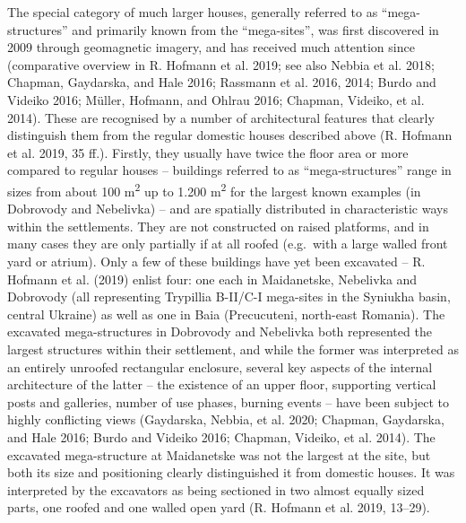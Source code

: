 \documentclass[
  12pt,
  a4paper, twoside]{book}
\begin{document}
The special category of much larger houses, generally referred to as ``mega-structures'' and primarily known from the ``mega-sites'', was first discovered in 2009 through geomagnetic imagery, and has received much attention since (comparative overview in R. Hofmann et al. 2019; see also Nebbia et al. 2018; Chapman, Gaydarska, and Hale 2016; Rassmann et al. 2016, 2014; Burdo and Videiko 2016; Müller, Hofmann, and Ohlrau 2016; Chapman, Videiko, et al. 2014). These are recognised by a number of architectural features that clearly distinguish them from the regular domestic houses described above (R. Hofmann et al. 2019, 35 ff.). Firstly, they usually have twice the floor area or more compared to regular houses -- buildings referred to as ``mega-structures'' range in sizes from about 100 m\textsuperscript{2} up to 1.200 m\textsuperscript{2} for the largest known examples (in Dobrovody and Nebelivka) -- and are spatially distributed in characteristic ways within the settlements. They are not constructed on raised platforms, and in many cases they are only partially if at all roofed (e.g.~with a large walled front yard or atrium). Only a few of these buildings have yet been excavated -- R. Hofmann et al. (2019) enlist four: one each in Maidanetske, Nebelivka and Dobrovody (all representing Trypillia B-II/C-I mega-sites in the Syniukha basin, central Ukraine) as well as one in Baia (Precucuteni, north-east Romania). The excavated mega-structures in Dobrovody and Nebelivka both represented the largest structures within their settlement, and while the former was interpreted as an entirely unroofed rectangular enclosure, several key aspects of the internal architecture of the latter -- the existence of an upper floor, supporting vertical posts and galleries, number of use phases, burning events -- have been subject to highly conflicting views (Gaydarska, Nebbia, et al. 2020; Chapman, Gaydarska, and Hale 2016; Burdo and Videiko 2016; Chapman, Videiko, et al. 2014). The excavated mega-structure at Maidanetske was not the largest at the site, but both its size and positioning clearly distinguished it from domestic houses. It was interpreted by the excavators as being sectioned in two almost equally sized parts, one roofed and one walled open yard (R. Hofmann et al. 2019, 13--29).
\end{document}
